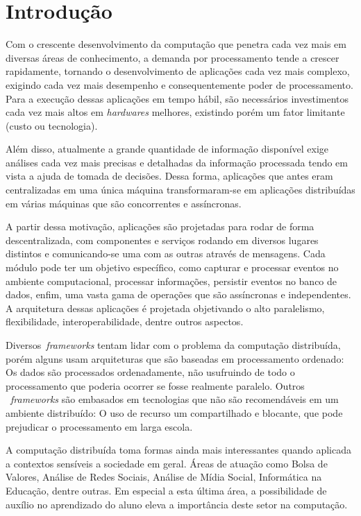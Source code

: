 \chapter{Introdução}

Com o crescente desenvolvimento da computação que penetra cada vez mais em diversas áreas de conhecimento, a demanda por processamento tende a crescer rapidamente, tornando o desenvolvimento de aplicações cada vez mais complexo, exigindo cada vez mais desempenho e consequentemente poder de processamento. Para a execução dessas aplicações em tempo hábil, são necessários investimentos cada vez mais altos em \emph{hardwares} melhores, existindo porém um fator limitante (custo ou tecnologia).

Além disso, atualmente a grande quantidade de informação disponível exige análises cada vez mais precisas e detalhadas da informação processada tendo em vista a ajuda de tomada de decisões. Dessa forma, aplicações que antes eram centralizadas em uma única máquina transformaram-se em aplicações distribuídas em várias máquinas que são concorrentes e assíncronas.

A partir dessa motivação, aplicações são projetadas para rodar de forma descentralizada, com componentes e serviços rodando em diversos lugares distintos e comunicando-se uma com as outras através de mensagens. Cada módulo pode ter um objetivo específico, como capturar e processar eventos no ambiente computacional, processar informações, persistir eventos no banco de dados, enfim, uma vasta gama de operações que são assíncronas e independentes. A arquitetura dessas aplicações é projetada objetivando o alto paralelismo, flexibilidade, interoperabilidade, dentre outros aspectos.

Diversos~\emph{frameworks} tentam lidar com o problema da computação distribuída, porém alguns usam arquiteturas que são baseadas em processamento ordenado: Os dados são processados ordenadamente, não usufruindo de todo o processamento que poderia ocorrer se fosse realmente paralelo. Outros ~\emph{frameworks} são embasados em tecnologias que não são recomendáveis em um ambiente distribuído: O uso de recurso um compartilhado e blocante, que pode prejudicar o processamento em larga escola.

A computação distribuída toma formas ainda mais interessantes quando aplicada a contextos sensíveis a sociedade em geral. Áreas de atuação como Bolsa de Valores, Análise de Redes Sociais, Análise de Mídia Social, Informática na Educação, dentre outras. Em especial a esta última área, a possibilidade de auxílio no aprendizado do aluno eleva a importância deste setor na computação.

